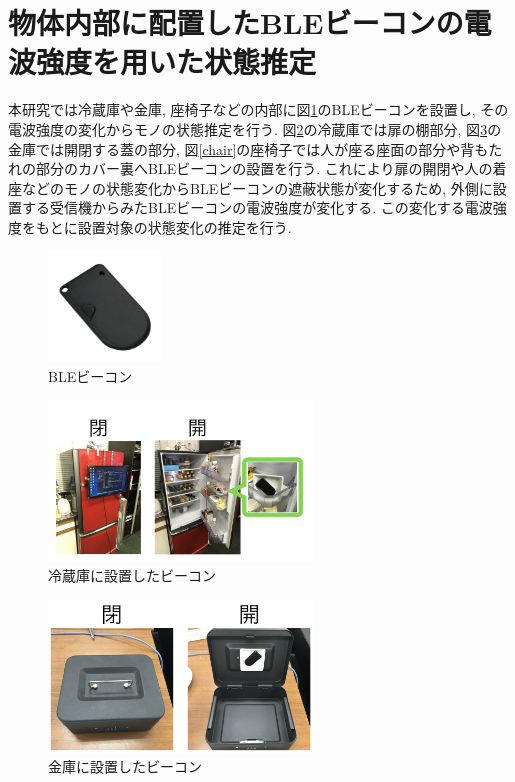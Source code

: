 \documentclass[Japanese]{dicomopapers}
\begin{document}





\section{物体内部に配置したBLEビーコンの電波強度を用いた状態推定}
本研究では冷蔵庫や金庫, 座椅子などの内部に図\ref{beacon}のBLEビーコンを設置し, その電波強度の変化からモノの状態推定を行う.
図\ref{freezer}の冷蔵庫では扉の棚部分, 図\ref{safe}の金庫では開閉する蓋の部分, 図\ref{chair}の座椅子では人が座る座面の部分や背もたれの部分のカバー裏へBLEビーコンの設置を行う.
これにより扉の開閉や人の着座などのモノの状態変化からBLEビーコンの遮蔽状態が変化するため, 外側に設置する受信機からみたBLEビーコンの電波強度が変化する.
この変化する電波強度をもとに設置対象の状態変化の推定を行う.
\begin{figure}[ht]
    \centering
    \includegraphics[width=3cm]{ble.png}
    \caption{BLEビーコン}
    \label{beacon}
   \end{figure}
\begin{figure}[ht]
    \centering
    \includegraphics[width=7cm]{regisW.png}
    \caption{冷蔵庫に設置したビーコン}
    \label{freezer}
\end{figure}
\begin{figure}[ht]
    \centering
    \includegraphics[width=7cm]{kinkoW.png}
    \caption{金庫に設置したビーコン}
    \label{safe}
\end{figure}
\end{document}
